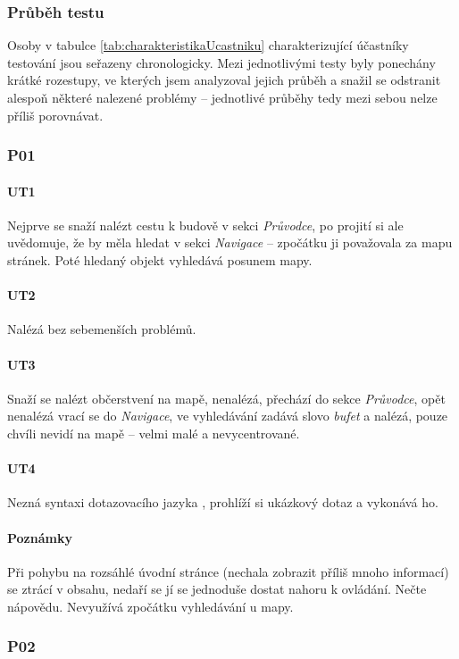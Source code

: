\subsubsection{Průběh testu}
Osoby v tabulce \ref{tab:charakteristikaUcastniku} charakterizující účastníky testování jsou seřazeny chronologicky. Mezi jednotlivými testy byly ponechány krátké rozestupy, ve kterých jsem analyzoval jejich průběh a snažil se odstranit alespoň některé nalezené problémy -- jednotlivé průběhy tedy mezi sebou nelze příliš porovnávat.
\subsubsection*{P01}
\paragraph*{UT1}
Nejprve se snaží nalézt cestu k budově v sekci \textit{Průvodce}, po projití si ale uvědomuje, že by měla hledat v sekci \textit{Navigace} -- zpočátku ji považovala za mapu stránek. Poté hledaný objekt vyhledává posunem mapy.
\paragraph*{UT2}
Nalézá bez sebemenších problémů.
\paragraph*{UT3}
Snaží se nalézt občerstvení na mapě, nenalézá, přechází do sekce \textit{Průvodce}, opět nenalézá vrací se do \textit{Navigace}, ve vyhledávání zadává slovo \textit{bufet} a nalézá, pouze chvíli nevidí na mapě -- velmi malé a nevycentrované.
\paragraph*{UT4}
Nezná syntaxi dotazovacího jazyka , prohlíží si ukázkový dotaz a vykonává ho.
\paragraph*{Poznámky}
Při pohybu na rozsáhlé úvodní stránce (nechala zobrazit příliš mnoho informací) se ztrácí v obsahu, nedaří se jí se jednoduše dostat nahoru k ovládání. Nečte nápovědu. Nevyužívá zpočátku vyhledávání u mapy.

\subsubsection*{P02}

